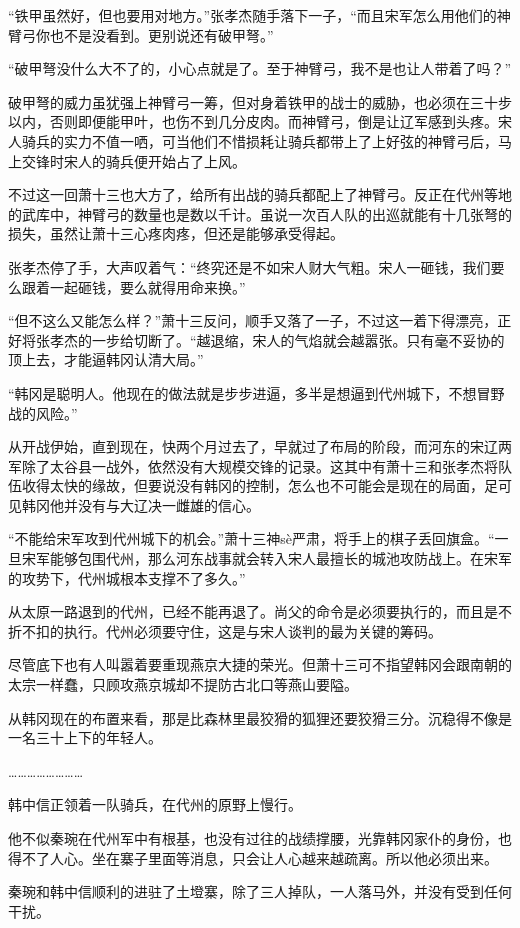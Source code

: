 “铁甲虽然好，但也要用对地方。”张孝杰随手落下一子，“而且宋军怎么用他们的神臂弓你也不是没看到。更别说还有破甲弩。”

“破甲弩没什么大不了的，小心点就是了。至于神臂弓，我不是也让人带着了吗？”

破甲弩的威力虽犹强上神臂弓一筹，但对身着铁甲的战士的威胁，也必须在三十步以内，否则即便能甲叶，也伤不到几分皮肉。而神臂弓，倒是让辽军感到头疼。宋人骑兵的实力不值一哂，可当他们不惜损耗让骑兵都带上了上好弦的神臂弓后，马上交锋时宋人的骑兵便开始占了上风。

不过这一回萧十三也大方了，给所有出战的骑兵都配上了神臂弓。反正在代州等地的武库中，神臂弓的数量也是数以千计。虽说一次百人队的出巡就能有十几张弩的损失，虽然让萧十三心疼肉疼，但还是能够承受得起。

张孝杰停了手，大声叹着气：“终究还是不如宋人财大气粗。宋人一砸钱，我们要么跟着一起砸钱，要么就得用命来换。”

“但不这么又能怎么样？”萧十三反问，顺手又落了一子，不过这一着下得漂亮，正好将张孝杰的一步给切断了。“越退缩，宋人的气焰就会越嚣张。只有毫不妥协的顶上去，才能逼韩冈认清大局。”

“韩冈是聪明人。他现在的做法就是步步进逼，多半是想逼到代州城下，不想冒野战的风险。”

从开战伊始，直到现在，快两个月过去了，早就过了布局的阶段，而河东的宋辽两军除了太谷县一战外，依然没有大规模交锋的记录。这其中有萧十三和张孝杰将队伍收得太快的缘故，但要说没有韩冈的控制，怎么也不可能会是现在的局面，足可见韩冈他并没有与大辽决一雌雄的信心。

“不能给宋军攻到代州城下的机会。”萧十三神sè严肃，将手上的棋子丢回旗盒。“一旦宋军能够包围代州，那么河东战事就会转入宋人最擅长的城池攻防战上。在宋军的攻势下，代州城根本支撑不了多久。”

从太原一路退到的代州，已经不能再退了。尚父的命令是必须要执行的，而且是不折不扣的执行。代州必须要守住，这是与宋人谈判的最为关键的筹码。

尽管底下也有人叫嚣着要重现燕京大捷的荣光。但萧十三可不指望韩冈会跟南朝的太宗一样蠢，只顾攻燕京城却不提防古北口等燕山要隘。

从韩冈现在的布置来看，那是比森林里最狡猾的狐狸还要狡猾三分。沉稳得不像是一名三十上下的年轻人。

……………………

韩中信正领着一队骑兵，在代州的原野上慢行。

他不似秦琬在代州军中有根基，也没有过往的战绩撑腰，光靠韩冈家仆的身份，也得不了人心。坐在寨子里面等消息，只会让人心越来越疏离。所以他必须出来。

秦琬和韩中信顺利的进驻了土墱寨，除了三人掉队，一人落马外，并没有受到任何干扰。

